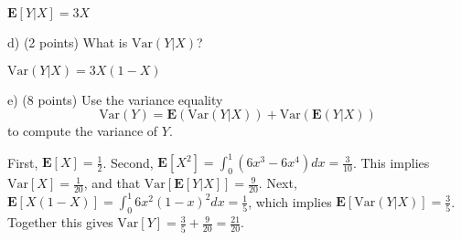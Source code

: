 \documentclass[12pt,english]{article}
\begin{document}
$\mathbf{E}[Y | X] = 3X$

\vspace{1em}
d) (2 points) What is $\text{Var}(Y|X)$?
\vspace{1em}

$\text{Var}(Y | X) = 3X(1 - X)$

\vspace{1em}
e) (8 points) Use the variance equality
$$ \text{Var}(Y) = \mathbf{E}(\text{Var}(Y|X)) + \text{Var}(\mathbf{E}(Y|X)) $$
to compute the variance of $Y$.
\vspace{1em}

First, $ \mathbf{E}[X] = \frac{1}{2} $. Second, $\mathbf{E}[X^{2}] = \int_{0}^{1} (6x^{3} - 6 x^{4}) dx = \frac{3}{10}$. This implies $\text{Var}[X] = \frac{1}{20}$, and that $\text{Var}[\mathbf{E}[Y | X]] = \frac{9}{20}$. Next, $\mathbf{E}[X(1 - X)] = \int_{0}^{1} 6x^{2}(1 - x)^{2} dx = \frac{1}{5}$, which implies $\mathbf{E}[\text{Var}(Y | X)] = \frac{3}{5}$. Together this gives $\text{Var}[Y] = \frac{3}{5} + \frac{9}{20} = \frac{21}{20}$.
\end{document}
